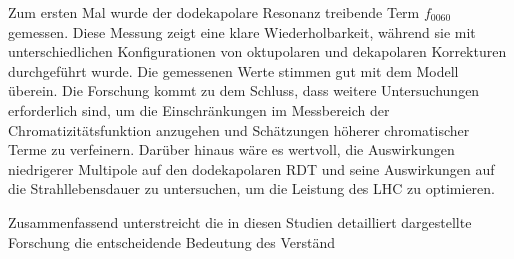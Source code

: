 {Zum ersten Mal wurde der dodekapolare Resonanz treibende Term $f_{0060}$ gemessen. Diese Messung zeigt eine klare Wiederholbarkeit, während sie mit unterschiedlichen Konfigurationen von oktupolaren und dekapolaren Korrekturen durchgeführt wurde. Die gemessenen Werte stimmen gut mit dem Modell überein. Die Forschung kommt zu dem Schluss, dass weitere Untersuchungen erforderlich sind, um die Einschränkungen im Messbereich der Chromatizitätsfunktion anzugehen und Schätzungen höherer chromatischer Terme zu verfeinern. Darüber hinaus wäre es wertvoll, die Auswirkungen niedrigerer Multipole auf den dodekapolaren RDT und seine Auswirkungen auf die Strahllebensdauer zu untersuchen, um die Leistung des LHC zu optimieren.

Zusammenfassend unterstreicht die in diesen Studien detailliert dargestellte Forschung die entscheidende Bedeutung des Verständ

}